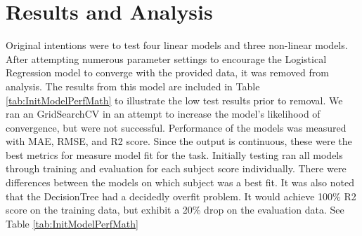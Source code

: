 \documentclass[doc]{apa6} %
\begin{document}
\section{Results and Analysis}
Original intentions were to test four linear models and three non-linear models. After attempting numerous parameter settings to encourage the Logistical Regression model to converge with the provided data, it was removed from analysis. The results from this model are included in Table \ref{tab:InitModelPerfMath} to illustrate the low test results prior to removal. We ran an GridSearchCV in an attempt to increase the model's likelihood of convergence, but were not successful.
Performance of the models was measured with MAE, RMSE, and R2 score. Since the output is continuous, these were the best metrics for measure model fit for the task.
Initially testing ran all models through training and evaluation for each subject score individually. There were differences between the models on which subject was a best fit.  It was also noted that the DecisionTree had a decidedly overfit problem. It would achieve 100\% R2 score on the training data, but exhibit a 20\% drop on the evaluation data. See Table \ref{tab:InitModelPerfMath}
\end{document}
